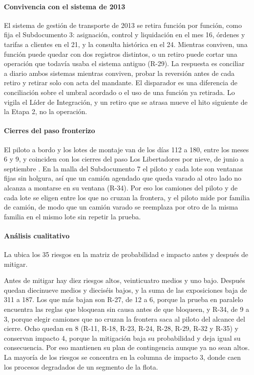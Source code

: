 \paragraph{Convivencia con el sistema de 2013}
El sistema de gestión de transporte de 2013 se retira función por función, como fija el Subdocumento 3:
asignación, control y liquidación en el mes 16, órdenes y tarifas a clientes en el 21, y la consulta
histórica en el 24. Mientras conviven, una función puede quedar con dos registros distintos, o un
retiro puede cortar una operación que todavía usaba el sistema antiguo (R-29). La respuesta es
conciliar a diario ambos sistemas mientras conviven, probar la reversión antes de cada retiro y retirar
solo con acta del mandante. El disparador es una diferencia de conciliación sobre el umbral acordado o
el uso de una función ya retirada. Lo vigila el Líder de Integración, y un retiro que se atrasa mueve el
hito siguiente de la Etapa 2, no la operación.

\paragraph{Cierres del paso fronterizo}
El piloto a bordo y los lotes de montaje van de los días 112 a 180, entre los meses 6 y 9, y coinciden con
los cierres del paso Los Libertadores por nieve, de junio a septiembre . En la
malla del Subdocumento 7 el piloto y cada lote son ventanas fijas sin holgura, así que un camión agendado
que queda varado al otro lado no alcanza a montarse en su ventana (R-34). Por eso los camiones del piloto
y de cada lote se eligen entre los que no cruzan la frontera, y el piloto mide por familia de camión, de
modo que un camión varado se reemplaza por otro de la misma familia en el mismo lote sin repetir la prueba.

\paragraph{Análisis cualitativo}
La  ubica los 35 riesgos en la matriz de probabilidad e impacto antes y después de
mitigar.


Antes de mitigar hay diez riesgos altos, veinticuatro medios y uno bajo. Después quedan diecinueve
medios y dieciséis bajos, y la suma de las exposiciones baja de 311 a 187. Los que más bajan son R-27, de
12 a 6, porque la prueba en paralelo encuentra las reglas que bloquean sin causa antes de que bloqueen, y
R-34, de 9 a 3, porque elegir camiones que no cruzan la frontera saca al piloto del alcance del cierre.
Ocho quedan en 8 (R-11, R-18, R-23, R-24, R-28, R-29, R-32 y R-35) y conservan impacto 4, porque la
mitigación baja su probabilidad y deja igual su consecuencia. Por eso mantienen su plan de contingencia aunque ya no sean altos. La mayoría de los
riesgos se concentra en la columna de impacto 3, donde caen los procesos degradados de un segmento de la
flota.

